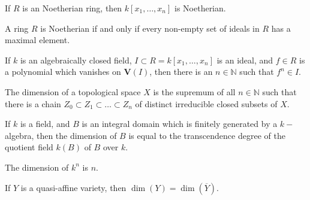 \documentclass[crop=false,class=article,oneside]{standalone}
\begin{document}
            \begin{theorem}
                If $R$ is an Noetherian ring,
                then $k[x_1,\hdots ,x_n]$ is Noetherian.
            \end{theorem}
            \begin{theorem}
                A ring $R$ is Noetherian if and only if every
                non-empty set of ideals in $R$ has a maximal element.
            \end{theorem}
            \begin{theorem}
                If $k$ is an algebraically closed field,
                $I\subset R = k[x_1,\hdots ,x_n]$ is an ideal,
                and $f\in R$ is a polynomial which vanishes on
                $\mathbf{V}(I)$, then there is an $n\in \mathbb{N}$
                such that $f^{n}\in{I}$.
            \end{theorem}
            \begin{definition}
                The dimension of a topological space $X$ is the
                supremum of all $n\in \mathbb{N}$ such that
                there is a chain
                $Z_0\subset Z_1\subset\hdots\subset Z_n$
                of distinct irreducible closed
                subsets of $X$.
            \end{definition}
            \begin{theorem}
                If $k$ is a field, and $B$ is an integral domain
                which is finitely generated by a $k-$algebra,
                then the dimension of $B$ is equal to the
                transcendence degree of the quotient field $k(B)$
                of $B$ over $k$.
            \end{theorem}
            \begin{theorem}
                The dimension of $k^{n}$ is $n$.
            \end{theorem}
            \begin{theorem}
                If $Y$ is a quasi-affine variety,
                then $\dim(Y)=\dim(\overline{Y})$.
            \end{theorem}
\end{document}
